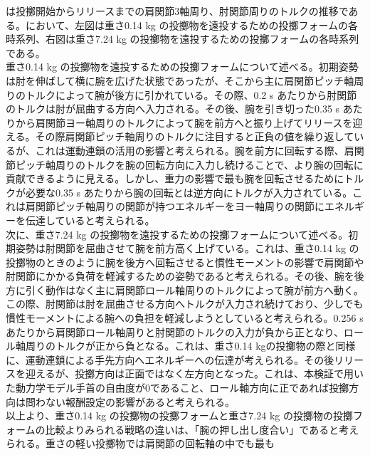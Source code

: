 は投擲開始からリリースまでの肩関節3軸周り、肘関節周りのトルクの推移である。において、左図は重さ0.14 kg の投擲物を遠投するための投擲フォームの各時系列、右図は重さ7.24 kg の投擲物を遠投するための投擲フォームの各時系列である。\\
重さ0.14 kg の投擲物を遠投するための投擲フォームについて述べる。初期姿勢は肘を伸ばして横に腕を広げた状態であったが、そこから主に肩関節ピッチ軸周りのトルクによって腕が後方に引かれている。その際、0.2 s あたりから肘関節のトルクは肘が屈曲する方向へ入力される。その後、腕を引き切った0.35 s あたりから肩関節ヨー軸周りのトルクによって腕を前方へと振り上げてリリースを迎える。その際肩関節ピッチ軸周りのトルクに注目すると正負の値を繰り返しているが、これは運動連鎖の活用の影響と考えられる。腕を前方に回転する際、肩関節ピッチ軸周りのトルクを腕の回転方向に入力し続けることで、より腕の回転に貢献できるように見える。しかし、重力の影響で最も腕を回転させるためにトルクが必要な0.35 s あたりから腕の回転とは逆方向にトルクが入力されている。これは肩関節ピッチ軸周りの関節が持つエネルギーをヨー軸周りの関節にエネルギーを伝達していると考えられる。\\
次に、重さ7.24 kg の投擲物を遠投するための投擲フォームについて述べる。初期姿勢は肘関節を屈曲させて腕を前方高く上げている。これは、重さ0.14 kg の投擲物のときのように腕を後方へ回転させると慣性モーメントの影響で肩関節や肘関節にかかる負荷を軽減するための姿勢であると考えられる。その後、腕を後方に引く動作はなく主に肩関節ロール軸周りのトルクによって腕が前方へ動く。この際、肘関節は肘を屈曲させる方向へトルクが入力され続けており、少しでも慣性モーメントによる腕への負担を軽減しようとしていると考えられる。0.256 s あたりから肩関節ロール軸周りと肘関節のトルクの入力が負から正となり、ロール軸周りのトルクが正から負となる。これは、重さ0.14 kgの投擲物の際と同様に、運動連鎖による手先方向へエネルギーへの伝達が考えられる。その後リリースを迎えるが、投擲方向は正面ではなく左方向となった。これは、本検証で用いた動力学モデル手首の自由度が0であること、ロール軸方向に正であれば投擲方向は問わない報酬設定の影響があると考えられる。\\
以上より、重さ0.14 kg の投擲物の投擲フォームと重さ7.24 kg の投擲物の投擲フォームの比較よりみられる戦略の違いは、「腕の押し出し度合い」であると考えられる。重さの軽い投擲物では肩関節の回転軸の中でも最も


